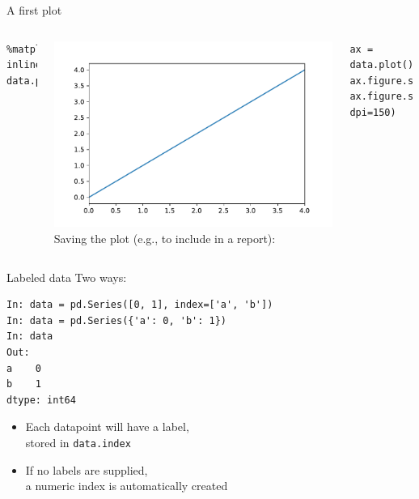 \documentclass[aspectratio=169,usenames,dvipsnames]{beamer}
\begin{document}
\begin{frame}[fragile]{A first plot}
\begin{columns}
\begin{lstlisting}
%matplotlib inline
data.plot()
\end{lstlisting}  %
\includegraphics[height=0.5\textheight]{fig/basicplot}
\pause{}
Saving the plot (e.g., to include in a report):
\begin{lstlisting}
ax = data.plot()
ax.figure.savefig('plot.pdf')
ax.figure.savefig('plot.png', dpi=150)
\end{lstlisting}
\end{columns}
\end{frame}

\begin{frame}[fragile]{Labeled data}
Two ways:
\begin{lstlisting}
In: data = pd.Series([0, 1], index=['a', 'b'])
In: data = pd.Series({'a': 0, 'b': 1})
In: data
Out:
a    0
b    1
dtype: int64
\end{lstlisting}

\begin{itemize}
    \item Each datapoint will have a label, \\
        stored in \texttt{data.index}
    \item If no labels are supplied, \\
        a numeric index is automatically created
\end{itemize}
\end{frame}
\end{document}

